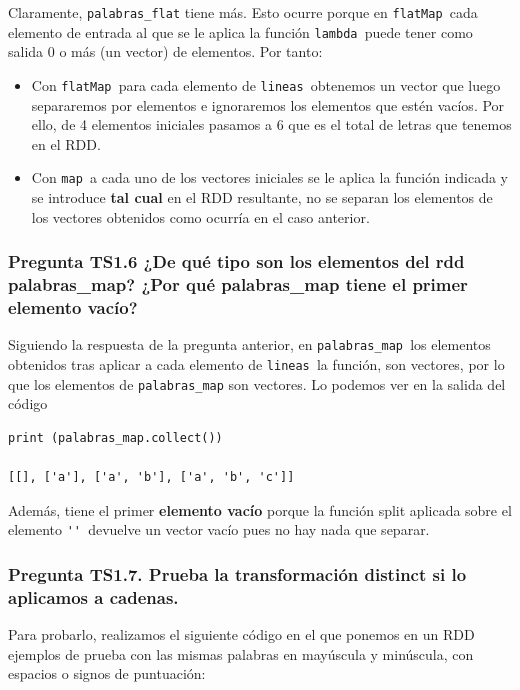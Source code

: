 \documentclass[11pt]{article}
\def\inline{\lstinline[basicstyle=\ttfamily,keywordstyle={}]}
\begin{document}
{{Claramente,  \inline{palabras_flat} tiene más. Esto ocurre porque en \inline{flatMap }cada elemento de entrada al que se le aplica la función \inline{lambda }puede tener como salida 0 o más (un vector) de elementos. Por tanto:
\begin{itemize}
\item Con \inline{flatMap }para cada elemento de \inline{lineas }obtenemos un vector que luego separaremos por elementos e ignoraremos los elementos que estén vacíos. Por ello, de 4 elementos iniciales pasamos a 6 que es el total de letras que tenemos en el RDD.
\item Con \inline{map }a cada uno de los vectores iniciales se le aplica la función indicada y se introduce \textbf{tal cual} en el RDD resultante, no se separan los elementos de los vectores obtenidos como ocurría en el caso anterior.
\end{itemize}

\subsubsection*{ Pregunta TS1.6 ¿De qué tipo son los elementos del rdd palabras\_map? ¿Por qué palabras\_map tiene el primer elemento vacío?}

Siguiendo la respuesta de la pregunta anterior, en \inline{palabras_map }los elementos obtenidos tras aplicar a cada elemento de  \inline{lineas }la función, son vectores, por lo que los elementos de \inline{palabras_map} son vectores.  Lo podemos ver en la salida del código

\begin{verbatim}
print (palabras_map.collect())

[[], ['a'], ['a', 'b'], ['a', 'b', 'c']]
\end{verbatim}

Además, tiene el primer \textbf{elemento vacío} porque la función split aplicada sobre el elemento \inline{'' }devuelve un vector vacío pues no hay nada que separar.


\subsubsection*{ Pregunta TS1.7. Prueba la transformación distinct si lo aplicamos a cadenas.}

Para probarlo, realizamos el siguiente código en el que ponemos en un RDD ejemplos de prueba con las mismas palabras en mayúscula y minúscula, con espacios o signos de puntuación:

}}
\end{document}
